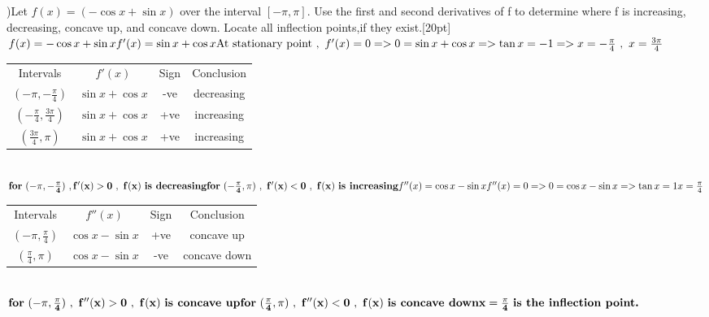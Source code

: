 \documentclass{article}
\begin{document}
)Let $f(x) = (-\cos x + \sin x)$ over the interval $[-\pi, \pi]$. Use the first and second
derivatives of f to determine where f is increasing, decreasing, concave up,
and concave down. Locate all inflection points,if they exist.[20pt]
$f(x) = -\cos x + \sin x\\[6pt]
f'(x) = \sin x + \cos x \\[6pt]
\text{At stationary point} \ , \ f'(x) = 0 \\[6pt]
=> 0 = \sin x + \cos x \\[6pt]
=> \tan x = -1 \\[6pt]
=> x = -\frac{\pi}{4} \ , \  x = \frac{3\pi}{4} \\[6pt]$
\begin{table}[htbp!]
    \centering
    \begin{tabular}{c|c|c|c}
        Intervals & $f'(x)$ & Sign & Conclusion \\[6pt]
         $(-\pi,-\frac{\pi}{4})$ & $\sin x  + \cos x$ & -ve & decreasing \\[6pt]
         $(-\frac{\pi}{4},\frac{3\pi}{4})$ & $\sin x  + \cos x$ & +ve & increasing \\[6pt]
         $(\frac{3\pi}{4},\pi)$ & $\sin x  + \cos x$ & +ve & increasing
    \end{tabular}
\end{table} \\[6pt]
$ \textbf{for} \  \mathbf{(-\pi,-\frac{\pi}{4}) \ ,f'(x)>0 \ ,\   f(x)} \  \textbf{is decreasing} \\[6pt]
\textbf{for} \ \mathbf{(-\frac{\pi}{4},\pi) \ , \ f'(x)<0 \ ,\  f(x)} \  \textbf{is increasing} \\[10pt]
f''(x) = \cos x - \sin x \\[6pt]
 f''(x) = 0 \\[6pt]
=> 0 = \cos x - \sin x\\[6pt]
=> \tan x = 1 \\[6pt]
x = \frac{\pi}{4} \\[6pt]$
\begin{table}[htbp!]
    \centering
    \begin{tabular}{c|c|c|c}
        Intervals & $f''(x)$ & Sign & Conclusion \\[6pt]
         $(-\pi,\frac{\pi}{4})$ & $\cos x  - \sin x$ & +ve & concave up  \\[6pt]
         $(\frac{\pi}{4},\pi)$ & $\cos x  - \sin x$ & -ve & concave down \\[6pt]
    \end{tabular}
\end{table} \\[6pt]
$ \textbf{for} \ \mathbf{(-\pi,\frac{\pi}{4}) \ , \ f''(x)>0 \ , \ f(x)} \  \textbf{is concave up} \\[6pt]
\textbf{for} \ \mathbf{(\frac{\pi}{4},\pi) \ , \ f''(x)<0 \ , \ f(x)} \ \textbf{is concave down} \\[6pt]
 \mathbf{ x = \frac{\pi}{4} }\  \textbf{is the inflection point.}\\[20pt]$
\end{document}
